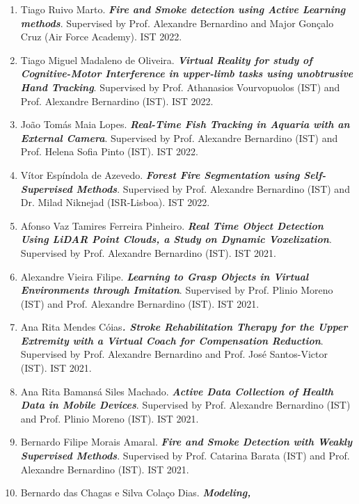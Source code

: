 \begin{enumerate}
{{  to Wildfire Aerial Thermal Image Segmentation Using Unsupervised
  Methods}}. Supervised by Prof. Alexandre Bernardino (IST) and Prof.
  Ricardo Ribeiro (IST). IST 2022.
\item
  Tiago Ruivo Marto. \emph{\textbf{Fire and Smoke detection using Active
  Learning methods}}. Supervised by Prof. Alexandre Bernardino and Major
  Gonçalo Cruz (Air Force Academy). IST 2022.
\item
  Tiago Miguel Madaleno de Oliveira. \emph{\textbf{Virtual Reality for
  study of Cognitive-Motor Interference in upper-limb tasks using
  unobtrusive Hand Tracking}}. Supervised by Prof. Athanasios
  Vourvopuolos (IST) and Prof. Alexandre Bernardino (IST). IST 2022.
\item
  João Tomás Maia Lopes. \emph{\textbf{Real-Time Fish Tracking in
  Aquaria with an External Camera}}. Supervised by Prof. Alexandre
  Bernardino (IST) and Prof. Helena Sofia Pinto (IST). IST 2022.
\item
  Vítor Espíndola de Azevedo. \emph{\textbf{Forest Fire Segmentation
  using Self-Supervised Methods}}. Supervised by Prof. Alexandre
  Bernardino (IST) and Dr. Milad Niknejad (ISR-Lisboa). IST 2022.
\item
  Afonso Vaz Tamires Ferreira Pinheiro. \emph{\textbf{Real Time Object
  Detection Using LiDAR Point Clouds, a Study on Dynamic Voxelization}}.
  Supervised by Prof. Alexandre Bernardino (IST). IST 2021.
\item
  Alexandre Vieira Filipe. \emph{\textbf{Learning to Grasp Objects in
  Virtual Environments through Imitation}}. Supervised by Prof. Plinio
  Moreno (IST) and Prof. Alexandre Bernardino (IST). IST 2021.
\item
  Ana Rita Mendes Cóias\emph{\textbf{. Stroke Rehabilitation Therapy for
  the Upper Extremity with a Virtual Coach for Compensation Reduction}}.
  Supervised by Prof. Alexandre Bernardino and Prof. José Santos-Victor
  (IST). IST 2021.
\item
  Ana Rita Bamansá Siles Machado. \emph{\textbf{Active Data Collection
  of Health Data in Mobile Devices}}. Supervised by Prof. Alexandre
  Bernardino (IST) and Prof. Plinio Moreno (IST). IST 2021.
\item
  Bernardo Filipe Morais Amaral. \emph{\textbf{Fire and Smoke Detection
  with Weakly Supervised Methods}}. Supervised by Prof. Catarina Barata
  (IST) and Prof. Alexandre Bernardino (IST). IST 2021.
\item
  Bernardo das Chagas e Silva Colaço Dias. \emph{\textbf{Modeling,
}}
\end{enumerate}
